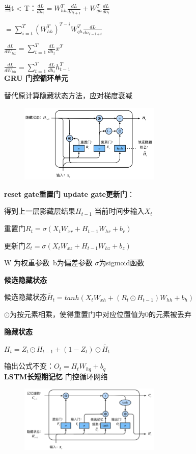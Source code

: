 \documentclass[UTF8]{ctexart}
\begin{document}
  \quad 当t < T：$\frac{d L}{d h_t} = W_{hh}^T\frac{d L}{d h_{t+1}} + W_{qh}^T\frac{d L}{d o_t}$
  
  \quad \quad $ = \sum_{i=t}^{T}(W_{hh}^T)^{T - i}W_{qh}^T\frac{d L}{d o_{T - i + t}}$
  
  \quad $\frac{d L}{d W_{hx}} = \sum_{t=1}^{T}\frac{d L}{d h_t}x^T$
  
  \quad $\frac{d L}{d W_{hh}} = \sum_{t=1}^{T}\frac{d L}{d h_t}h_{t-1}^T$\\
\textbf{GRU 门控循环单元}

  替代原计算隐藏状态方法，应对梯度衰减
  \begin{figure}[H] %
    \centering %
    \includegraphics[width=0.6\textwidth]{note_images/GRU.png} %
  \end{figure}

  \textbf{reset gate重置门 update gate更新门}：

  \quad 得到上一层影藏层结果$H_{t-1}$ 当前时间步输入$X_t$

  \quad 重置门$R_t = \sigma(X_tW_{xr} + H_{t-1}W_{hr} + b_r)$
  
  \quad 更新门$Z_t = \sigma(X_tW_{xz} + H_{t-1}W_{hz} + b_z)$

  \quad \quad W 为权重参数\ b为偏差参数 $\sigma$为sigmoid函数

  \textbf{候选隐藏状态}

  \quad 候选隐藏状态$\tilde{H_t} = tanh(X_tW_{xh} + (R_t \odot  H_{t-1})W_{hh} + b_h)$

  \quad \quad $\odot$为按元素相乘，使得重置门中对应位置值为0的元素被丢弃

  \textbf{隐藏状态}

  \quad $H_t = Z_t \odot H_{t-1} + (1-Z_t)\odot \tilde{H_t}$
  
  输出公式不变：$O_t = H_tW_{hq} + b_q$\\
\textbf{LSTM长短期记忆} 门控循环网络
  \begin{figure}[H] %
    \centering %
    \includegraphics[width=0.6\textwidth]{note_images/LSTM.png} %
  \end{figure}
  
\end{document}
